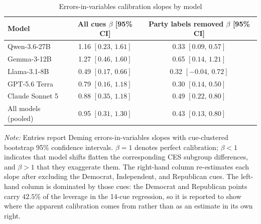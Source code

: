 \begin{table}[H]
\centering
\caption{Errors-in-variables calibration slopes by model}
\label{tab:calibration_slopes}
\small
\setlength{\tabcolsep}{8pt}
\begin{tabular}{lcc}
\toprule
\textbf{Model} & \shortstack{\textbf{All cues} \\ $\beta$ [95\% CI]} & \shortstack{\textbf{Party labels removed} \\ $\beta$ [95\% CI]} \\
\midrule
Qwen-3.6-27B & 1.16 $[0.23,\,1.61]$ & 0.33 $[0.09,\,0.57]$ \\
Gemma-3-12B & 1.27 $[0.46,\,1.60]$ & 0.65 $[0.14,\,1.21]$ \\
Llama-3.1-8B & 0.49 $[0.17,\,0.66]$ & 0.32 $[-0.04,\,0.72]$ \\
GPT-5.6 Terra & 0.79 $[0.16,\,1.18]$ & 0.30 $[0.14,\,0.50]$ \\
Claude Sonnet 5 & 0.88 $[0.35,\,1.18]$ & 0.49 $[0.22,\,0.80]$ \\
\midrule
All models (pooled) & 0.95 $[0.31,\,1.30]$ & 0.43 $[0.13,\,0.80]$ \\
\bottomrule
\end{tabular}

\vspace{3pt}
\begin{minipage}{0.92\linewidth}
\footnotesize\textit{Note:} Entries report Deming errors-in-variables slopes with cue-clustered bootstrap 95\% confidence intervals. $\beta=1$ denotes perfect calibration; $\beta<1$ indicates that model shifts flatten the corresponding CES subgroup differences, and $\beta>1$ that they exaggerate them. The right-hand column re-estimates each slope after excluding the Democrat, Independent, and Republican cues. The left-hand column is dominated by those cues: the Democrat and Republican points carry $42.5\%$ of the leverage in the 14-cue regression, so it is reported to show where the apparent calibration comes from rather than as an estimate in its own right.
\end{minipage}
\end{table}
